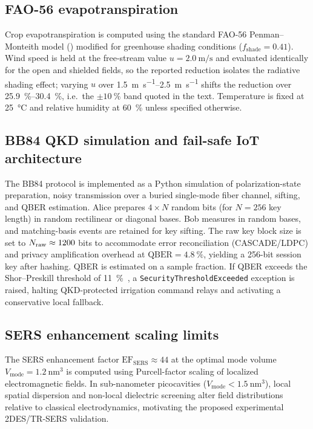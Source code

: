 \documentclass[12pt]{iopart}
\begin{document}
\subsection{FAO-56 evapotranspiration}

Crop evapotranspiration is computed using the standard FAO-56 Penman--Monteith model () modified for greenhouse shading conditions ($f_{\mathrm{shade}} = 0.41$). Wind speed is held at the free-stream value $u = \qty{2.0}{\m\per\s}$ and evaluated identically for the open and shielded fields, so the reported reduction isolates the radiative shading effect; varying $u$ over \qtyrange{1.5}{2.5}{\m\per\s} shifts the reduction over \qtyrange{25.9}{30.4}{\percent}, i.e.\ the $\pm\qty{10}{\percent}$ band quoted in the text. Temperature is fixed at \qty{25}{\celsius} and relative humidity at \qty{60}{\percent} unless specified otherwise.

\subsection{BB84 QKD simulation and fail-safe IoT architecture}

The BB84 protocol is implemented as a Python simulation of polarization-state preparation, noisy transmission over a buried single-mode fiber channel, sifting, and QBER estimation.
Alice prepares $4 \times N$ random bits (for $N = 256$ key length) in random rectilinear or diagonal bases.
Bob measures in random bases, and matching-basis events are retained for key sifting. The raw key block size is set to $N_{\rm raw} \approx 1200$ bits to accommodate error reconciliation (CASCADE/LDPC) and privacy amplification overhead at $\mathrm{QBER}=\qty{4.8}{\percent}$, yielding a 256-bit session key after hashing.
QBER is estimated on a sample fraction.
If QBER exceeds the Shor--Preskill threshold of \qty{11}{\percent}~\cite{Shor2000}, a \texttt{SecurityThresholdExceeded} exception is raised, halting QKD-protected irrigation command relays and activating a conservative local fallback.

\subsection{SERS enhancement scaling limits}

The SERS enhancement factor $\mathrm{EF}_{\mathrm{SERS}} \approx 44$ at the optimal mode volume $V_{\mathrm{mode}} = \qty{1.2}{\nm\cubed}$ is computed using Purcell-factor scaling of localized electromagnetic fields. In sub-nanometer picocavities ($V_{\mathrm{mode}} < \qty{1.5}{\nm\cubed}$), local spatial dispersion and non-local dielectric screening alter field distributions relative to classical electrodynamics, motivating the proposed experimental 2DES/TR-SERS validation.
\end{document}
